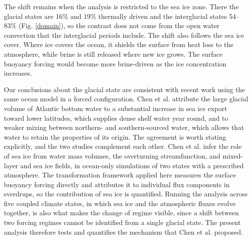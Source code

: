 \documentclass[pdflatex,sn-nature]{sn-jnl}
\begin{document}
The shift remains when the analysis is restricted to the sea ice zone. There the glacial states are 16\% and 19\% thermally driven and the interglacial states 54--83\% (Fig. \ref{domain}), so the contrast does not come from the open water convection that the interglacial periods include. The shift also follows the sea ice cover. Where ice covers the ocean, it shields the surface from heat loss to the atmosphere, while brine is still released where new ice grows. The surface buoyancy forcing would become more brine-driven as the ice concentration increases.

Our conclusions about the glacial state are consistent with recent work using the same ocean model in a forced configuration. Chen et al. \cite{Chen2025} attribute the large glacial volume of Atlantic bottom water to a substantial increase in sea ice export toward lower latitudes, which supplies dense shelf water year round, and to weaker mixing between northern- and southern-sourced water, which allows that water to retain the properties of its origin. The agreement is worth stating explicitly, and the two studies complement each other. Chen et al. infer the role of sea ice from water mass volumes, the overturning streamfunction, and mixed-layer and sea ice fields, in ocean-only simulations of two states with a prescribed atmosphere. The transformation framework applied here measures the surface buoyancy forcing directly and attributes it to individual flux components in sverdrups, so the contribution of sea ice is quantified. Running the analysis across five coupled climate states, in which sea ice and the atmospheric fluxes evolve together, is also what makes the change of regime visible, since a shift between two forcing regimes cannot be identified from a single glacial state. The present analysis therefore tests and quantifies the mechanism that Chen et al. proposed.
\end{document}
